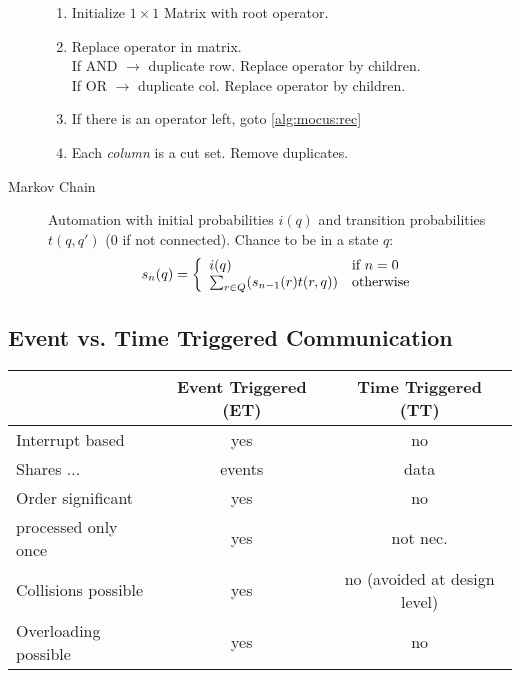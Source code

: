 \begin{description}
    \begin{enumerate}
        \item Initialize $1 \times 1$ Matrix with root operator.
        \item \label{alg:mocus:rec} Replace operator in matrix. \\
        If AND $\rightarrow$ duplicate row. Replace operator by children.\\
        If OR  $\rightarrow$ duplicate col. Replace operator by children.
        \item If there is an operator left, goto \ref{alg:mocus:rec}\\
        \item Each \emph{column} is a cut set. Remove duplicates.
    \end{enumerate}
    \item[Markov Chain] Automation with initial probabilities $i(q)$ and
    transition probabilities $t(q, q')$ (0 if not connected). Chance to be in a
    state $q$:
    \[ s_n(q) = \left\{ \begin{array}{ll} i(q) & \mbox{if } n = 0 \\ \sum_{r \in Q}(s_{n-1}(r)t(r,q)) & \mbox{otherwise} \end{array} \right. \]
\end{description}

\subsection*{Event vs. Time Triggered Communication}
\begin{tabular}{l |c | c}
                    & Event Triggered (ET)  & Time Triggered (TT) \\
\hline
Interrupt based     & yes                   & no \\
Shares ...          & events                & data\\
Order significant   & yes                   & no\\
processed only once & yes                   & not nec.\\
Collisions possible & yes                   & no (avoided at design level)\\
Overloading possible& yes                   & no
\end{tabular}

